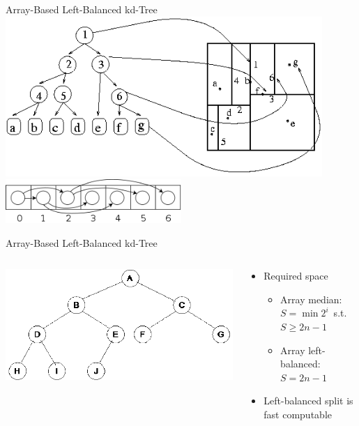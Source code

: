 \documentclass{beamer}
\begin{document}
\begin{frame}{Array-Based Left-Balanced kd-Tree}
	\centering
	\includegraphics[width=0.9\textwidth]{kdtree.png}\\
	\includegraphics[width=0.5\textwidth]{kdtree_array.png}
\end{frame}

\begin{frame}{Array-Based Left-Balanced kd-Tree}
	\begin{columns}
		\begin{column}{0.5\textwidth}
			\includegraphics[width=1.1\textwidth]{left_balanced_tree.png}
		\end{column}
		\begin{column}{0.5\textwidth}
			\begin{itemize}
			\item Required space
				\begin{itemize}
					\item Array median: \mbox{$S = \min{2^i}$ s.t. $S \geq 2n - 1$}
					\item Array left-balanced: $S = 2n - 1$
				\end{itemize}
				\item Left-balanced split is fast computable
			\end{itemize}
		\end{column}
	\end{columns}
\end{frame}
\end{document}
